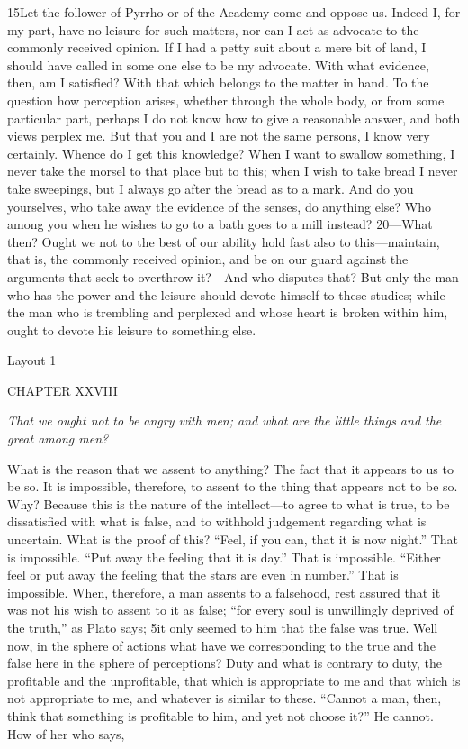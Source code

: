 15Let the follower of Pyrrho or of the Academy come and oppose us. Indeed I, for my part, have no leisure for such matters, nor can I act as advocate to the commonly received opinion. If I had a petty suit about a mere bit of land, I should have called in some one else to be my advocate. With what evidence, then, am I satisfied? With that which belongs to the matter in hand. To the question how perception arises, whether through the whole body, or from some particular part, perhaps I do not know how to give a reasonable answer, and both views perplex me. But that you and I are not the same persons, I know very certainly. Whence do I get this knowledge? When I want to swallow something, I never take the morsel to that place but to this; when I wish to take bread I never take sweepings, but I always go after the bread as to a mark. And do you yourselves, who take away the evidence of the senses, do anything else? Who among you when he wishes to go to a bath goes to a mill instead? 20—What then? Ought we not to the best of our ability hold fast also to this—maintain, that is, the commonly received opinion, and be on our guard against the arguments that seek to overthrow it?—And who disputes that? But only the man who has the power and the leisure should devote himself to these studies; while the man who is trembling and perplexed and whose heart is broken within him, ought to devote his leisure to something else.



Layout 1

CHAPTER XXVIII

\emph{That we ought not to be angry with men; and what are the little things and the great among men?}

What is the reason that we assent to anything? The fact that it appears to us to be so. It is impossible, therefore, to assent to the thing that appears not to be so. Why? Because this is the nature of the intellect—to agree to what is true, to be dissatisfied with what is false, and to withhold judgement regarding what is uncertain. What is the proof of this? ``Feel, if you can, that it is now night.'' That is impossible. ``Put away the feeling that it is day.'' That is impossible. ``Either feel or put away the feeling that the stars are even in number.'' That is impossible. When, therefore, a man assents to a falsehood, rest assured that it was not his wish to assent to it as false; ``for every soul is unwillingly deprived of the truth,'' as Plato says; 5it only seemed to him that the false was true. Well now, in the sphere of actions what have we corresponding to the true and the false here in the sphere of perceptions? Duty and what is contrary to duty, the profitable and the unprofitable, that which is appropriate to me and that which is not appropriate to me, and whatever is similar to these. ``Cannot a man, then, think that something is profitable to him, and yet not choose it?'' He cannot. How of her who says,

